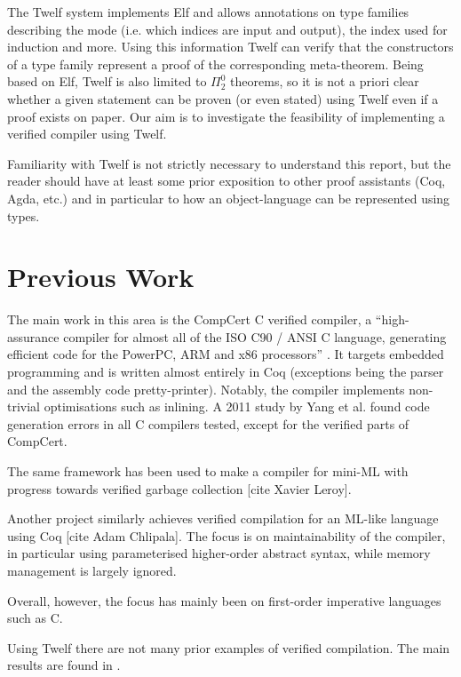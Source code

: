 The Twelf system implements Elf and allows annotations on type families describing the mode (i.e. which indices are input and output), the index used for induction and more.
Using this information Twelf can verify that the constructors of a type family represent a proof of the corresponding meta-theorem.
Being based on Elf, Twelf is also limited to $\Pi_2^0$ theorems, so it is not a priori clear whether a given statement can be proven (or even stated) using Twelf even if a proof exists on paper.
Our aim is to investigate the feasibility of implementing a verified compiler using Twelf.

Familiarity with Twelf is not strictly necessary to understand this report, but the reader should have at least some prior exposition to other proof assistants (Coq, Agda, etc.) and in particular to how an object-language can be represented using types.


\section{Previous Work}

The main work in this area is the CompCert C verified compiler, a ``high-assurance compiler for almost all of the ISO C90 / ANSI C language, generating efficient code for the PowerPC, ARM and x86 processors'' \cite{CompCert16}.
It targets embedded programming and is written almost entirely in Coq (exceptions being the parser and the assembly code pretty-printer).
Notably, the compiler implements non-trivial optimisations such as inlining.
A 2011 study by Yang et al. \cite{Yang11} found code generation errors in all C compilers tested, except for the verified parts of CompCert.

The same framework has been used to make a compiler for mini-ML with progress towards verified garbage collection [cite Xavier Leroy].

Another project similarly achieves verified compilation for an ML-like language using Coq [cite Adam Chlipala].
The focus is on maintainability of the compiler, in particular using parameterised higher-order abstract syntax, while memory management is largely ignored.

Overall, however, the focus has mainly been on first-order imperative languages such as C.

Using Twelf there are not many prior examples of verified compilation.
The main results are found in \cite[ch. 6]{Pfenning01}.

